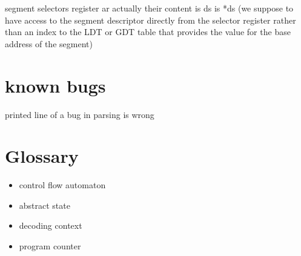 \documentclass{report}
\begin{document}
segment selectors register ar actually their content is ds is *ds (we
suppose to have access to the segment descriptor directly from the
selector register rather than an index to the LDT or GDT table that
provides the value for the base address of the segment)

\chapter{known bugs}
printed line of a bug in parsing is wrong
\chapter{Glossary}
\begin{itemize}
\item control flow automaton
\item abstract state
\item decoding context
\item program counter
\end{itemize}
\end{document}
